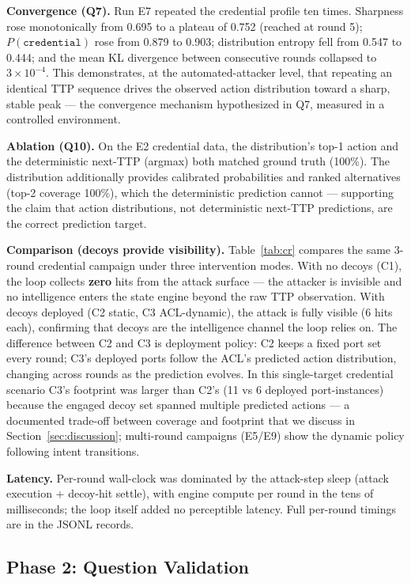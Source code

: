 \documentclass[preprints,article,accept,oneauthor]{Definitions/mdpi}
\newcommand{\act}[1]{\texttt{#1}}
\begin{document}
\textbf{Convergence (Q7).} Run E7 repeated the credential profile ten times.
Sharpness rose monotonically from 0.695 to a plateau of 0.752 (reached at
round 5); $P(\act{credential})$ rose from 0.879 to 0.903; distribution
entropy fell from 0.547 to 0.444; and the mean KL divergence between
consecutive rounds collapsed to $3\times10^{-4}$. This demonstrates, at the
automated-attacker level, that repeating an identical TTP sequence drives
the observed action distribution toward a sharp, stable peak --- the
convergence mechanism hypothesized in Q7, measured in a controlled
environment.

\textbf{Ablation (Q10).} On the E2 credential data, the distribution's top-1
action and the deterministic next-TTP (argmax) both matched ground truth
(100\%). The distribution additionally provides calibrated probabilities
and ranked alternatives (top-2 coverage 100\%), which the deterministic
prediction cannot --- supporting the claim that action distributions, not
deterministic next-TTP predictions, are the correct prediction target.

\textbf{Comparison (decoys provide visibility).} Table~\ref{tab:cr} compares
the same 3-round credential campaign under three intervention modes. With
no decoys (C1), the loop collects \textbf{zero} hits from the attack
surface --- the attacker is invisible and no intelligence enters the state
engine beyond the raw TTP observation. With decoys deployed (C2 static,
C3 ACL-dynamic), the attack is fully visible (6 hits each), confirming that
decoys are the intelligence channel the loop relies on. The difference
between C2 and C3 is deployment policy: C2 keeps a fixed port set every
round; C3's deployed ports follow the ACL's predicted action distribution,
changing across rounds as the prediction evolves. In this single-target
credential scenario C3's footprint was larger than C2's (11 vs 6 deployed
port-instances) because the engaged decoy set spanned multiple predicted
actions --- a documented trade-off between coverage and footprint that we
discuss in Section~\ref{sec:discussion}; multi-round campaigns (E5/E9)
show the dynamic policy following intent transitions.

\textbf{Latency.} Per-round wall-clock was dominated by the attack-step
sleep (attack execution + decoy-hit settle), with engine compute per round
in the tens of milliseconds; the loop itself added no perceptible latency.
Full per-round timings are in the JSONL records.

\subsection{Phase 2: Question Validation}
\end{document}
